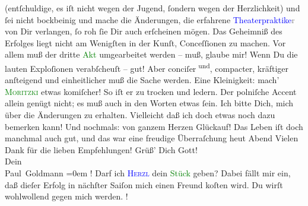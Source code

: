                (entſchuldige, es iſt nicht wegen der Jugend, ſondern {\pb}wegen der Herzlichkeit) und ſei nicht bockbeinig und
               mache die Änderungen, die erfahrene \textcolor{blue}{Theaterpraktike\textcolor{gray}{r}}{} von Dir verlangen, ſo roh ſie Dir auch erſcheinen mögen. Das Geheimniß des
               Erfolges liegt nicht am Wenigſten in der Kunſt, Conceſſionen zu machen. Vor allem muß
               der dritte \textcolor{green}{Akt}{} umgearbeitet
               werden – muß, glaube mir! Wenn Du die lauten Exploſionen verabſcheuſt – gut! Aber conciſer\substVorne{}\textsuperscript{{ }und}\substDazwischen{},\substHinten{} compacter, kräftiger anſteigend und einheitlicher muß die Sache werden. Eine
               Kleinigkeit: mach’ \textsc{\textcolor{green}{Moritzki}{}} etwas komiſcher! {\pb}So iſt er zu trocken und ledern. Der polniſche
               Accent allein genügt nicht; es muß auch in den Worten etwas ſein. Ich bitte Dich,
               mich über die Änderungen \label{K_L02675-2v}\label{K_L02675-2h} zu
               erhalten. Vielleicht daß ich doch etwas noch dazu bemerken kann! Und nochmals: von
               ganzem Herzen Glückauf! Das Leben iſt doch manchmal auch gut, und das war eine
               freudige Überraſchung heut{ }Abend{\dotsfour}\pend
           \pstart
           Vielen Dank für die lieben Empfehlungen!\pend
           \pstart
           Grüß’ Dich Gott! {\\[\baselineskip]}Dein {\\[\baselineskip]}\spacefill\mbox{Paul Goldmann}\pend
           \leftskip=0em{}\pstart
           \noindent{}\label{K_L02675-3v}\label{K_L02675-3h}!\pend
           \pstart
           {\pb}Darf ich \textsc{\textcolor{blue}{Herzl}{}\ledrightnote{\textcolor{blue}{Theodor Herzl}}} dein \textcolor{green}{Stück}{}\ledrightnote{\textcolor{green}{Das Märchen. Schauspiel in drei Aufzügen}} geben?\pend
           \pstart
           Dabei fällt mir ein, daß dieſer Erfolg in nächſter Saiſon mich einen Freund koſten
                  wird.  Du wirſt wohlwollend gegen mich werden.
                     \label{K_L02675-4v}\label{K_L02675-4h}!\pend
           \endnumbering{}  
      